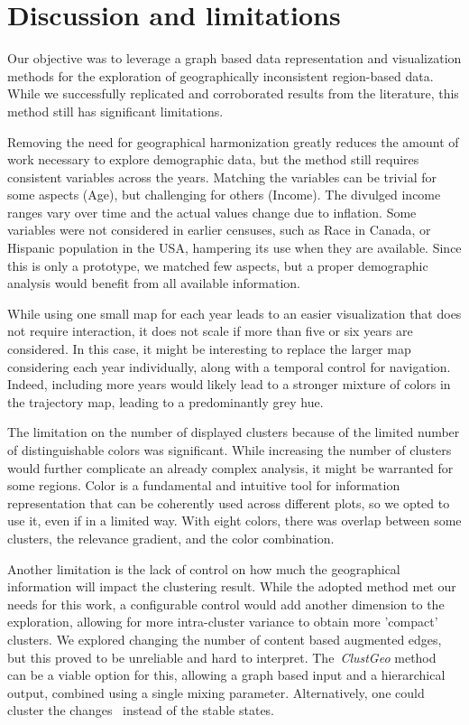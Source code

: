 \section{Discussion and limitations}

Our objective was to leverage a graph based data representation and
visualization methods for the exploration of geographically inconsistent
region-based data. While we successfully replicated and corroborated results
from the literature, this method still has significant limitations. 


Removing the need for geographical harmonization greatly reduces the amount of
work necessary to explore demographic data, but the method still requires
consistent variables across the years. Matching the variables can be trivial for
some aspects (Age), but challenging for others (Income). The divulged income
ranges vary over time and the actual values change due to inflation. Some
variables were not considered in earlier censuses, such as Race in Canada, or
Hispanic population in the USA, hampering its use when they are available. Since
this is only a prototype, we matched few aspects, but a proper demographic
analysis would benefit from all available information.


While using one small map for each year leads to an easier visualization that
does not require interaction, it does not scale if more than five or six years
are considered. In this case, it might be interesting to replace the larger map
considering each year individually, along with a temporal control for
navigation. Indeed, including more years would likely lead  to a stronger
mixture of colors in the trajectory map, leading to a predominantly grey hue.


The limitation on the number of displayed clusters because of the limited number
of distinguishable colors was significant. While increasing the number of
clusters would further complicate an already complex analysis, it might be
warranted for some regions. Color is a fundamental and intuitive tool for
information representation that can be coherently used across different plots,
so we opted to use it, even if in a limited way. With eight colors, there was
overlap between some clusters, the relevance gradient, and the color
combination. 



Another limitation is the lack of control on how much the geographical
information will impact the clustering result. While the adopted method met our
needs for this work, a configurable control would add another dimension to the
exploration, allowing for more intra-cluster variance to obtain more 'compact'
clusters. We explored changing the number of content based augmented edges, but
this proved to be unreliable and hard to interpret. The~\emph{ClustGeo}
method~\cite{Chavent2017} can be a viable option for this, allowing a graph
based input and a hierarchical output, combined using a single mixing
parameter. Alternatively, one could cluster the changes~\cite{bian2018survey}
instead of the stable states.


